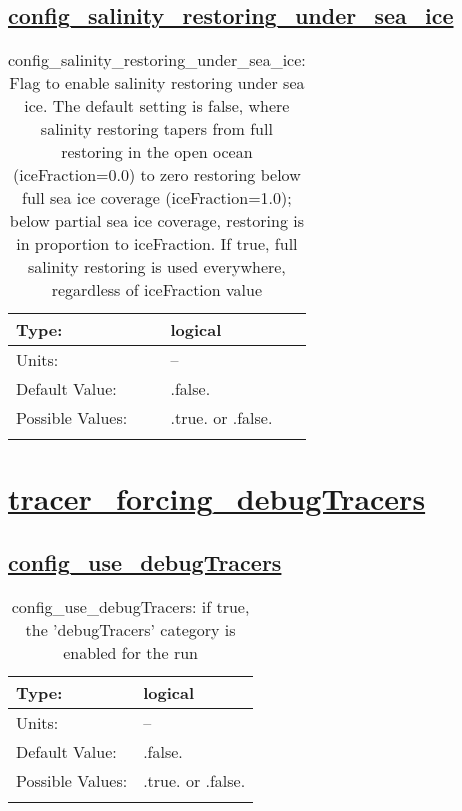 \subsection[config\_salinity\_restoring\_under\_sea\_ice]{\hyperref[sec:nm_tab_tracer_forcing_activeTracers]{config\_salinity\_restoring\_under\_sea\_ice}}
\label{subsec:nm_sec_config_salinity_restoring_under_sea_ice}
\begin{center}
\begin{longtable}{| p{2.0in} || p{4.0in} |}
    \hline
    Type: & logical \\
    \hline
    Units: & -- \\
    \hline
    Default Value: & .false. \\
    \hline
    Possible Values: & .true. or .false. \\
    \hline
    \caption{config\_salinity\_restoring\_under\_sea\_ice: Flag to enable salinity restoring under sea ice.  The default setting is false, where salinity restoring tapers from full restoring in the open ocean (iceFraction=0.0) to zero restoring below full sea ice coverage (iceFraction=1.0); below partial sea ice coverage, restoring is in proportion to iceFraction.  If true, full salinity restoring is used everywhere, regardless of iceFraction value}
\end{longtable}
\end{center}
\section[tracer\_forcing\_debugTracers]{\hyperref[sec:nm_tab_tracer_forcing_debugTracers]{tracer\_forcing\_debugTracers}}
\label{sec:nm_sec_tracer_forcing_debugTracers}
\subsection[config\_use\_debugTracers]{\hyperref[sec:nm_tab_tracer_forcing_debugTracers]{config\_use\_debugTracers}}
\label{subsec:nm_sec_config_use_debugTracers}
\begin{center}
\begin{longtable}{| p{2.0in} || p{4.0in} |}
    \hline
    Type: & logical \\
    \hline
    Units: & -- \\
    \hline
    Default Value: & .false. \\
    \hline
    Possible Values: & .true. or .false. \\
    \hline
    \caption{config\_use\_debugTracers: if true, the 'debugTracers' category is enabled for the run}
\end{longtable}
\end{center}
